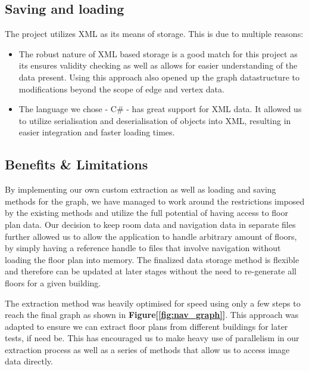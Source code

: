 \documentclass[main.tex]{subfiles}
\begin{document}
\subsection*{Saving and loading}
The project utilizes XML as its means of storage. This is due to multiple reasons:
	
\begin{itemize}

\item The robust nature of XML based storage is a good match for this project as its ensures validity checking as well as allows for easier understanding of the data present. Using this approach also opened up the graph datastructure to modifications beyond the scope of edge and vertex data. 
		
\item The language we chose - C\# - has great support for XML data. It allowed us to utilize serialisation and deserialisation of objects into XML, resulting in easier integration and faster loading times.
\end{itemize}

\subsection*{Benefits \& Limitations}
By implementing our own custom extraction as well as loading and saving methods for the graph, we have managed to work around the restrictions imposed by the existing methods and utilize the full potential of having access to floor plan data. Our decision to keep room data and navigation data in separate files further allowed us to allow the application to handle arbitrary amount of floors, by simply having a reference handle to files that involve navigation without loading the floor plan into memory. The finalized data storage method is flexible and therefore can be updated at later stages without the need to re-generate all floors for a given building.
\newline

The extraction method was heavily optimised for speed using only a few steps to reach the final graph as shown in \textbf{Figure[\ref{fig:nav_graph}]}. This approach was adapted to ensure we can extract floor plans from different buildings for later tests, if need be. This has encouraged us to make heavy use of parallelism in our extraction process as well as a series of methods that allow us to access image data directly. 
\newline
\end{document}
